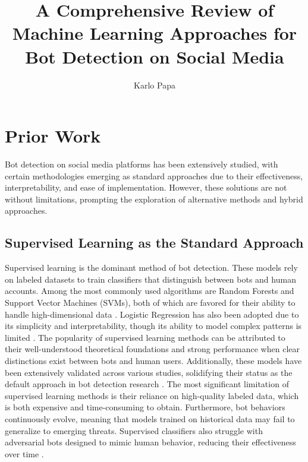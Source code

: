 \documentclass[10pt,twocolumn]{article}
\title{A Comprehensive Review of Machine Learning Approaches for Bot Detection on Social Media}
\author{Karlo Papa}
\affiliation{Occidental College}
\begin{document}
\maketitle

\section{Prior Work}
Bot detection on social media platforms has been extensively studied, with certain methodologies emerging as standard approaches due to their effectiveness, interpretability, and ease of implementation. However, these solutions are not without limitations, prompting the exploration of alternative methods and hybrid approaches. 

\subsection{Supervised Learning as the Standard Approach}
Supervised learning is the dominant method of bot detection. These models rely on labeled datasets to train classifiers that distinguish between bots and human accounts. Among the most commonly used algorithms are Random Forests and Support Vector Machines (SVMs), both of which are favored for their ability to handle high-dimensional data \cite{Heidari2021}. Logistic Regression has also been adopted due to its simplicity and interpretability, though its ability to model complex patterns is limited \cite{Cai2017}. The popularity of supervised learning methods can be attributed to their well-understood theoretical foundations and strong performance when clear distinctions exist between bots and human users. Additionally, these models have been extensively validated across various studies, solidifying their status as the default approach in bot detection research \cite{Heidari2021, Hayawi2023}. The most significant limitation of supervised learning methods is their reliance on high-quality labeled data, which is both expensive and time-consuming to obtain. Furthermore, bot behaviors continuously evolve, meaning that models trained on historical data may fail to generalize to emerging threats. Supervised classifiers also struggle with adversarial bots designed to mimic human behavior, reducing their effectiveness over time \cite{Orabi2020}.
\end{document}
